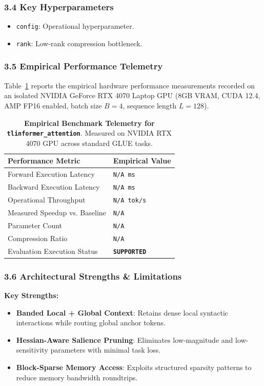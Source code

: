 \subsubsection*{3.4 Key Hyperparameters}
\begin{itemize}
    \item \texttt{config}: Operational hyperparameter.
    \item \texttt{rank}: Low-rank compression bottleneck.
\end{itemize}

\subsubsection*{3.5 Empirical Performance Telemetry}
Table~\ref{tab:telemetry_tlinformer\_attention} reports the empirical hardware performance measurements recorded on an isolated NVIDIA GeForce RTX 4070 Laptop GPU (8GB VRAM, CUDA 12.4, AMP FP16 enabled, batch size $B=4$, sequence length $L=128$).

\begin{table}[h]
\centering
\small
\caption{\textbf{Empirical Benchmark Telemetry for \texttt{tlinformer\_attention}}. Measured on NVIDIA RTX 4070 GPU across standard GLUE tasks.}
\label{tab:telemetry_tlinformer\_attention}
\begin{tabularx}{\columnwidth}{lX}
\toprule
\textbf{Performance Metric} & \textbf{Empirical Value} \\
\midrule
Forward Execution Latency & \texttt{N/A ms} \\
Backward Execution Latency & \texttt{N/A ms} \\
Operational Throughput & \texttt{N/A tok/s} \\
Measured Speedup vs. Baseline & \texttt{N/A} \\
Parameter Count & \texttt{N/A} \\
Compression Ratio & \texttt{N/A} \\
Evaluation Execution Status & \textbf{\texttt{SUPPORTED}} \\
\bottomrule
\end{tabularx}
\end{table}

\subsubsection*{3.6 Architectural Strengths \& Limitations}
\textbf{Key Strengths:}
\begin{itemize}
    \item \textbf{Banded Local + Global Context}: Retains dense local syntactic interactions while routing global anchor tokens.
    \item \textbf{Hessian-Aware Salience Pruning}: Eliminates low-magnitude and low-sensitivity parameters with minimal task loss.
    \item \textbf{Block-Sparse Memory Access}: Exploits structured sparsity patterns to reduce memory bandwidth roundtrips.
\end{itemize}

